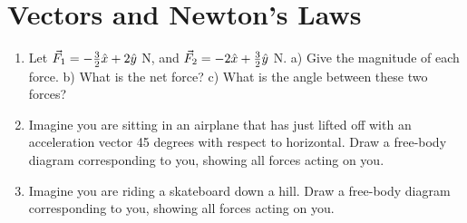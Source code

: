 \documentclass[10pt]{article}
\begin{document}
\maketitle

\section{Vectors and Newton's Laws}
\begin{enumerate}
\item Let $\vec{F}_{\rm 1} = -\frac{3}{2}\hat{x} + 2\hat{y}$ N, and $\vec{F}_{\rm 2} = -2\hat{x} + \frac{3}{2}\hat{y}$ N.  a) Give the magnitude of each force.  b) What is the net force?  c) What is the angle between these two forces? \vspace{2.0 cm}
\item Imagine you are sitting in an airplane that has just lifted off with an acceleration vector 45 degrees with respect to horizontal.  Draw a free-body diagram corresponding to you, showing all forces acting on you.
\vspace{2.0 cm}
\item Imagine you are riding a skateboard down a hill.  Draw a free-body diagram corresponding to you, showing all forces acting on you.
\vspace{2.0 cm}
\end{enumerate}
\end{document}
